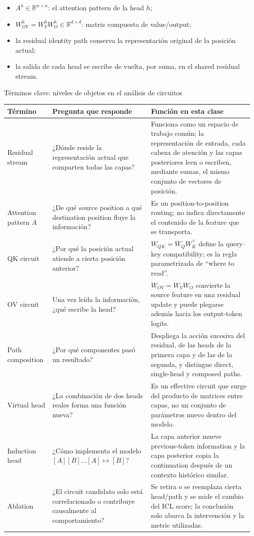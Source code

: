 \documentclass[a4paper]{article}
\begin{document}
\begin{itemize}
  \item $A^h\in\mathbb{R}^{n\times n}$: el attention pattern de la head $h$;
  \item $W_{OV}^h=W_V^hW_O^h\in\mathbb{R}^{d\times d}$: matriz compuesta de value/output;
  \item la residual identity path conserva la representación original de la posición actual;
  \item la salida de cada head se escribe de vuelta, por suma, en el shared residual stream.
\end{itemize}

\begin{knowledgebox}{Términos clave: niveles de objetos en el análisis de circuitos}
\small
\begin{tabularx}{\textwidth}{L{0.22\textwidth}L{0.28\textwidth}X}
\toprule
Término & Pregunta que responde & Función en esta clase \\
\midrule
Residual stream & ¿Dónde reside la representación actual que comparten todas las capas? & Funciona como un espacio de trabajo común; la representación de entrada, cada cabeza de atención y las capas posteriores leen o escriben, mediante sumas, el mismo conjunto de vectores de posición. \\
Attention pattern $A$ & ¿De qué source position a qué destination position fluye la información? & Es un position-to-position routing; no indica directamente el contenido de la feature que se transporta. \\
QK circuit & ¿Por qué la posición actual atiende a cierta posición anterior? & $W_{QK}=W_QW_K^{\top}$ define la query--key compatibility; es la regla parametrizada de ``where to read''. \\
OV circuit & Una vez leída la información, ¿qué escribe la head? & $W_{OV}=W_VW_O$ convierte la source feature en una residual update y puede plegarse además hacia los output-token logits. \\
Path composition & ¿Por qué componentes pasó un resultado? & Despliega la acción sucesiva del residual, de las heads de la primera capa y de las de la segunda, y distingue direct, single-head y composed paths. \\
Virtual head & ¿La combinación de dos heads reales forma una función nueva? & Es un effective circuit que surge del producto de matrices entre capas, no un conjunto de parámetros nuevo dentro del modelo. \\
Induction head & ¿Cómo implementa el modelo $[A][B]\ldots[A]\mapsto[B]$? & La capa anterior mueve previous-token information y la capa posterior copia la continuation después de un contexto histórico similar. \\
Ablation & ¿El circuit candidato solo está correlacionado o contribuye causalmente al comportamiento? & Se retira o se reemplaza cierta head/path y se mide el cambio del ICL score; la conclusión solo abarca la intervención y la metric utilizadas. \\
\bottomrule
\end{tabularx}
\end{knowledgebox}
\end{document}

